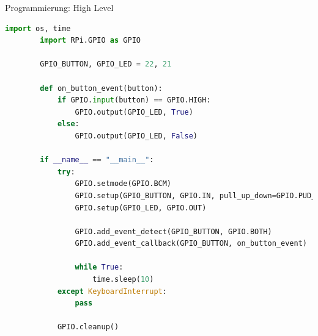 \begin{frame}[fragile]{Programmierung: High Level}

    \smallskip

    \begin{lstlisting}[language=Python, gobble=8, basicstyle=\tiny\ttfamily]
        import os, time
        import RPi.GPIO as GPIO

        GPIO_BUTTON, GPIO_LED = 22, 21

        def on_button_event(button):
            if GPIO.input(button) == GPIO.HIGH:
                GPIO.output(GPIO_LED, True)
            else:
                GPIO.output(GPIO_LED, False)

        if __name__ == "__main__":
            try:
                GPIO.setmode(GPIO.BCM)
                GPIO.setup(GPIO_BUTTON, GPIO.IN, pull_up_down=GPIO.PUD_UP)
                GPIO.setup(GPIO_LED, GPIO.OUT)

                GPIO.add_event_detect(GPIO_BUTTON, GPIO.BOTH)
                GPIO.add_event_callback(GPIO_BUTTON, on_button_event)

                while True:
                    time.sleep(10)
            except KeyboardInterrupt:
                pass

            GPIO.cleanup()
    \end{lstlisting}
\end{frame}

